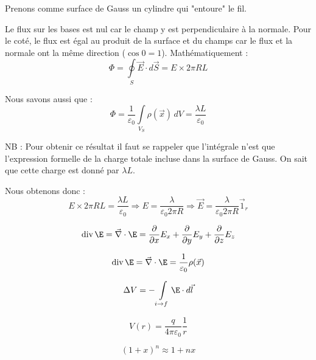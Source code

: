 \documentclass[british,french,11pt, a4paper, openany]{book}
\begin{document}
		Prenons comme surface de Gauss un cylindre qui "entoure" le fil.
			
		Le flux sur les bases est nul car le champ y est perpendiculaire à la normale. Pour le coté, le flux est égal au produit de la surface et du champs car le flux et la normale ont la même direction ($\cos 0 = 1$). Mathématiquement : $$ \Phi = \oint \limits_S \vec E \cdot d \vec S = E\times 2\pi RL $$
			
		Nous savons aussi que : $$ \Phi =\dfrac{1}{\varepsilon_0} \int \limits_{V_S} \rho (\vec x) \, dV = \dfrac{\lambda L}{\varepsilon_0}$$
			
		NB : Pour obtenir ce résultat il faut se rappeler que l'intégrale n'est que l'expression formelle de la charge totale incluse dans la surface de Gauss. On sait que cette charge est donné par $\lambda L$.
			
		Nous obtenons donc : $$ E\times 2\pi RL = \dfrac{\lambda L}{\varepsilon_0} \Rightarrow E = \dfrac{\lambda}{\varepsilon_0 2 \pi R} \Rightarrow \vec E = \dfrac{\lambda}{\varepsilon_0 2 \pi R} \vec 1_r $$
			
			
		$$ \text{div}\,\E = \vec \nabla \cdot \E = \dfrac{\partial}{\partial x} E_x + \dfrac{\partial}{\partial y} E_y + \dfrac{\partial}{\partial z} E_z$$
			
			
		$$ \text{div}\,\E = \vec \nabla \cdot \E = \dfrac{1}{\varepsilon_0}\rho (\vec x)$$
			
			
		$$ \Delta V = - \int \limits_{i \to f} \E \cdot d \vec l $$
			
			
		$$ V(r) = \dfrac{q}{4\pi\varepsilon_0}\dfrac{1}{r} $$
			
			
		$$ (1+x)^n \approx 1+nx $$
			
			
\end{document}
